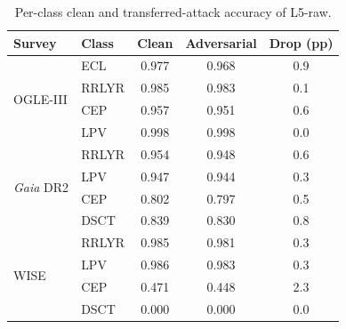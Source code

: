 \begin{table}[t]
\centering
\caption{Per-class clean and transferred-attack accuracy of L5-raw.}
\label{tab:per_class_l5_multi}
\begin{tabular}{llccc}
\toprule
Survey & Class & Clean & Adversarial & Drop (pp)\\
\midrule
\multirow{4}{*}{OGLE-III} & ECL & 0.977 & 0.968 & 0.9\\
 & RRLYR & 0.985 & 0.983 & 0.1\\
 & CEP & 0.957 & 0.951 & 0.6\\
 & LPV & 0.998 & 0.998 & 0.0\\
\midrule
\multirow{4}{*}{\textit{Gaia} DR2} & RRLYR & 0.954 & 0.948 & 0.6\\
 & LPV & 0.947 & 0.944 & 0.3\\
 & CEP & 0.802 & 0.797 & 0.5\\
 & DSCT & 0.839 & 0.830 & 0.8\\
\midrule
\multirow{4}{*}{WISE} & RRLYR & 0.985 & 0.981 & 0.3\\
 & LPV & 0.986 & 0.983 & 0.3\\
 & CEP & 0.471 & 0.448 & 2.3\\
 & DSCT & 0.000 & 0.000 & 0.0\\
\bottomrule
\end{tabular}
\end{table}
